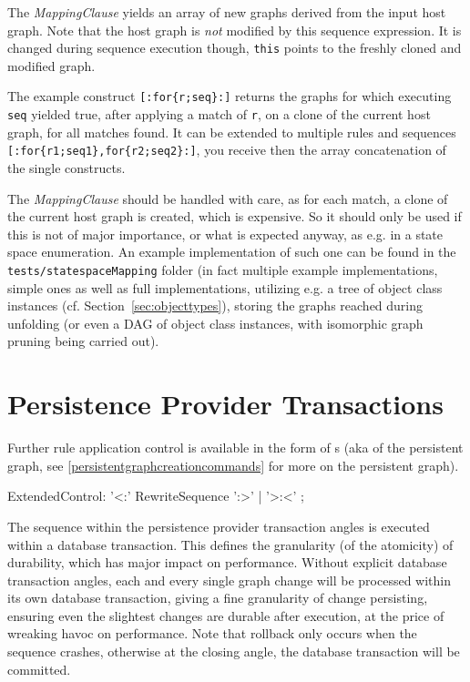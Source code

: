 The \emph{MappingClause} yields an array of new graphs derived from the input host graph.
Note that the host graph is \emph{not} modified by this sequence expression.
It is changed during sequence execution though, \texttt{this} points to the freshly cloned and modified graph.

The example construct \verb#[:for{r;seq}:]# returns the graphs for which executing \texttt{seq} yielded true, after applying a match of \texttt{r}, on a clone of the current host graph, for all matches found.
It can be extended to multiple rules and sequences \verb#[:for{r1;seq1},for{r2;seq2}:]#, you receive then the array concatenation of the single constructs.

The \emph{MappingClause} should be handled with care, as for each match, a clone of the current host graph is created, which is expensive.
So it should only be used if this is not of major importance, or what is expected anyway, as e.g. in a state space enumeration.
An example implementation of such one can be found in the \texttt{tests/statespaceMapping} folder
(in fact multiple example implementations, simple ones as well as full implementations, utilizing e.g. a tree of object class instances (cf. Section~\ref{sec:objecttypes}), storing the graphs reached during unfolding (or even a DAG of object class instances, with isomorphic graph pruning being carried out).


\section{Persistence Provider Transactions}\label{sec:pptransactions}

Further rule application control is available in the form of s (aka  of the persistent graph, see \ref{persistentgraphcreationcommands} for more on the persistent graph).

\begin{rail}
  ExtendedControl:
    '<:' RewriteSequence ':>' | 
    '>:<'
    ;
\end{rail}

The sequence within the persistence provider transaction angles is executed within a database transaction.
This defines the granularity (of the atomicity) of durability, which has major impact on performance.
Without explicit database transaction angles, each and every single graph change will be processed within its own database transaction, giving a fine granularity of change persisting, ensuring even the slightest changes are durable after execution, at the price of wreaking havoc on performance.
Note that rollback only occurs when the sequence crashes, otherwise at the closing angle, the database transaction will be committed.

